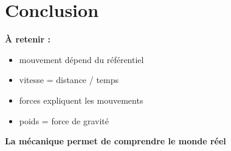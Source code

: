 \documentclass[11pt,a4paper]{article}
\begin{document}
\section{Conclusion}

\textbf{À retenir :}
\begin{itemize}
\item mouvement dépend du référentiel
\item vitesse = distance / temps
\item forces expliquent les mouvements
\item poids = force de gravité
\end{itemize}

\bigskip

\begin{center}
\Huge
\textbf{La mécanique permet de comprendre le monde réel}
\end{center}
\end{document}
